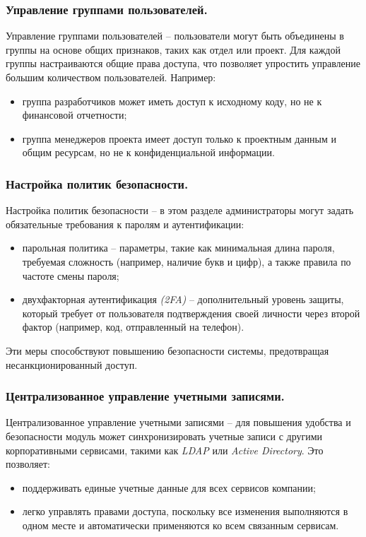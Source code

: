 \subsubsection{Управление группами пользователей.} Управление группами пользователей -- пользователи могут быть объединены в группы на основе общих признаков, таких как отдел или проект. Для каждой группы настраиваются общие права доступа, что позволяет упростить управление большим количеством пользователей. Например:
\begin{itemize}
    \item группа разработчиков может иметь доступ к исходному коду, но не к финансовой отчетности;
    \item группа менеджеров проекта имеет доступ только к проектным данным и общим ресурсам, но не к конфиденциальной информации.
\end{itemize}

\subsubsection{Настройка политик безопасности.} Настройка политик безопасности -- в этом разделе администраторы могут задать обязательные требования к паролям и аутентификации:
\begin{itemize}
    \item парольная политика -- параметры, такие как минимальная длина пароля, требуемая сложность (например, наличие букв и цифр), а также правила по частоте смены пароля;
    \item двухфакторная аутентификация \textit{(2FA)} -- дополнительный уровень защиты, который требует от пользователя подтверждения своей личности через второй фактор (например, код, отправленный на телефон).
\end{itemize}
Эти меры способствуют повышению безопасности системы, предотвращая несанкционированный доступ.

\subsubsection{Централизованное управление учетными записями.} Централизованное управление учетными записями -- для повышения удобства и безопасности модуль может синхронизировать учетные записи с другими корпоративными сервисами, такими как \textit{LDAP} или \textit{Active Directory}. Это позволяет:
\begin{itemize}
    \item поддерживать единые учетные данные для всех сервисов компании;
    \item легко управлять правами доступа, поскольку все изменения выполняются в одном месте и автоматически применяются ко всем связанным сервисам.
\end{itemize}

